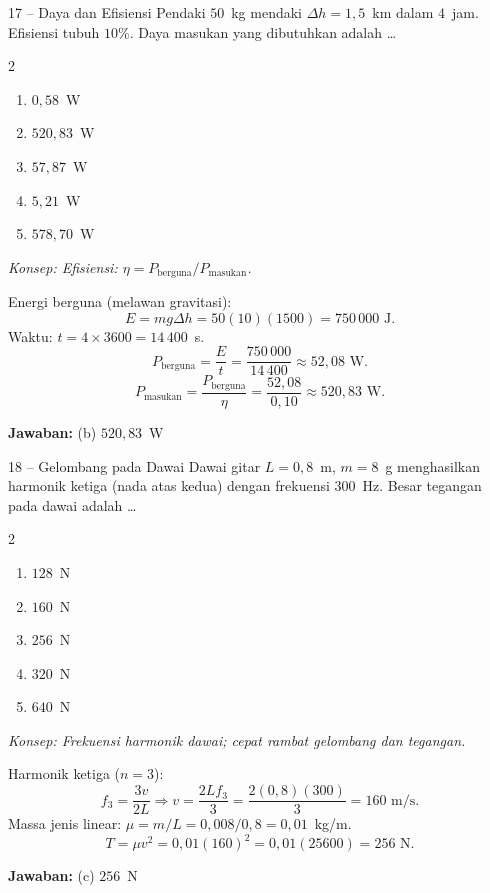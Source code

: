 \documentclass[11pt]{article}
\newcommand{\jawaban}[1]{%
  \noindent\colorbox{gold!30}{\parbox{\dimexpr\linewidth-2\fboxsep\relax}{%
    \textbf{Jawaban:} #1}}\par\smallskip}
\newcommand{\konsep}[1]{\textit{Konsep: #1.}\par\smallskip}
\newenvironment{pilB}{%
  \par\smallskip\begin{multicols}{2}
  \begin{enumerate}[label=(\alph*),leftmargin=*,itemsep=1pt,topsep=3pt]}%
  {\end{enumerate}\end{multicols}}
\begin{document}
\begin{soal}{17 -- Daya dan Efisiensi}
Pendaki $50$~kg mendaki $\Delta h=1{,}5$~km dalam $4$~jam. Efisiensi tubuh $10\%$.
Daya masukan yang dibutuhkan adalah \ldots
\begin{pilB}
  \item $0{,}58$~W \item $520{,}83$~W \item $57{,}87$~W \item $5{,}21$~W \item $578{,}70$~W
\end{pilB}
\end{soal}
\begin{pembox}
\konsep{Efisiensi: $\eta = P_{\text{berguna}}/P_{\text{masukan}}$}
Energi berguna (melawan gravitasi):
\[
E = mg\Delta h = 50(10)(1500) = 750\,000\text{ J}.
\]
Waktu: $t=4\times3600=14\,400$~s.
\[
P_{\text{berguna}} = \frac{E}{t} = \frac{750\,000}{14\,400} \approx 52{,}08\text{ W}.
\]
\[
P_{\text{masukan}} = \frac{P_{\text{berguna}}}{\eta} = \frac{52{,}08}{0{,}10} \approx 520{,}83\text{ W}.
\]
\jawaban{(b) $520{,}83$~W}
\end{pembox}

\begin{soal}{18 -- Gelombang pada Dawai}
Dawai gitar $L=0{,}8$~m, $m=8$~g menghasilkan harmonik ketiga (nada atas kedua) dengan
frekuensi $300$~Hz. Besar tegangan pada dawai adalah \ldots
\begin{pilB}
  \item $128$~N \item $160$~N \item $256$~N \item $320$~N \item $640$~N
\end{pilB}
\end{soal}
\begin{pembox}
\konsep{Frekuensi harmonik dawai; cepat rambat gelombang dan tegangan}
Harmonik ketiga ($n=3$):
\[
f_3 = \frac{3v}{2L} \Rightarrow v = \frac{2Lf_3}{3} = \frac{2(0{,}8)(300)}{3} = 160\text{ m/s}.
\]
Massa jenis linear: $\mu = m/L = 0{,}008/0{,}8 = 0{,}01$~kg/m.
\[
T = \mu v^2 = 0{,}01(160)^2 = 0{,}01(25600) = 256\text{ N}.
\]
\jawaban{(c) $256$~N}
\end{pembox}
\end{document}
